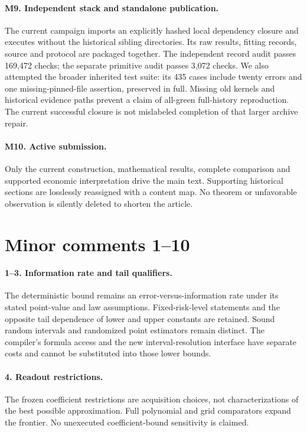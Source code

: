 \documentclass[11pt]{article}
\begin{document}
\paragraph{M9. Independent stack and standalone publication.}
The current campaign imports an explicitly hashed local dependency closure and executes without the historical sibling directories. Its raw results, fitting records, source and protocol are packaged together. The independent record audit passes 169,472 checks; the separate primitive audit passes 3,072 checks. We also attempted the broader inherited test suite: its 435 cases include twenty errors and one missing-pinned-file assertion, preserved in full. Missing old kernels and historical evidence paths prevent a claim of all-green full-history reproduction. The current successful closure is not mislabeled completion of that larger archive repair.

\paragraph{M10. Active submission.}
Only the current construction, mathematical results, complete comparison and supported economic interpretation drive the main text. Supporting historical sections are losslessly reassigned with a content map. No theorem or unfavorable observation is silently deleted to shorten the article.

\section*{Minor comments 1--10}
\paragraph{1--3. Information rate and tail qualifiers.}
The deterministic bound remains an error-versus-information rate under its stated point-value and law assumptions. Fixed-risk-level statements and the opposite tail dependence of lower and upper constants are retained. Sound random intervals and randomized point estimators remain distinct. The compiler's formula access and the new interval-resolution interface have separate costs and cannot be substituted into those lower bounds.
\paragraph{4. Readout restrictions.}
The frozen coefficient restrictions are acquisition choices, not characterizations of the best possible approximation. Full polynomial and grid comparators expand the frontier. No unexecuted coefficient-bound sensitivity is claimed.
\end{document}
